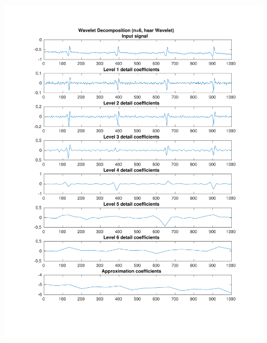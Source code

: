 \documentclass[11pt,a4paper]{article}
\begin{document}
\begin{figure}[H]
\centering
\begin{minipage}{0.48\textwidth}
	\centering
	\includegraphics[width=\textwidth]{fig/112l2_dwt1.pdf}
\end{minipage}
\begin{minipage}{0.48\textwidth}
	\centering

\end{minipage}
\end{figure}
\end{document}
